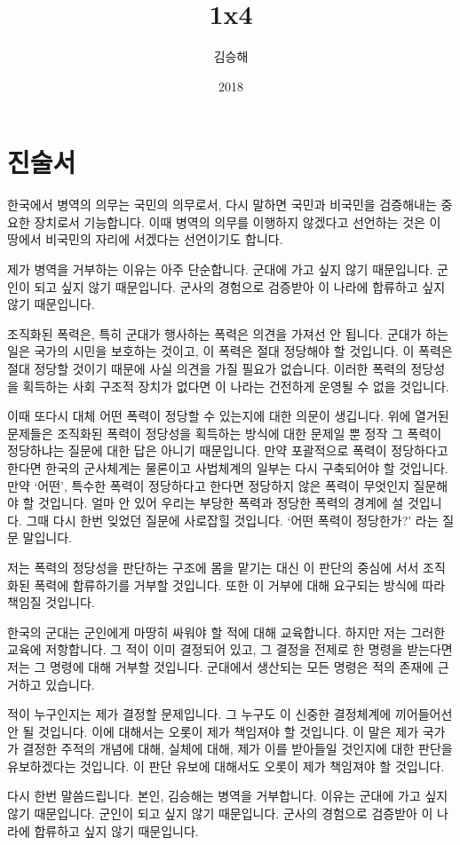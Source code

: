 \documentclass[12pt, b6paper, openany]{memoir}
\title{1x4}
\author{김승해}
\date{2018}
\newenvironment{article}{}{}
\begin{document}
\frontmatter
\begin{titlingpage}
\maketitle
\end{titlingpage}
  \tableofcontents
  
\mainmatter
\begin{article}
\hypertarget{uxc9c4uxc220uxc11c}{%
\chapter{진술서}\label{uxc9c4uxc220uxc11c}}

한국에서 병역의 의무는 국민의 의무로서, 다시 말하면 국민과 비국민을 검증해내는 중요한 장치로서 기능합니다. 이때 병역의 의무를 이행하지 않겠다고 선언하는 것은 이 땅에서 비국민의 자리에 서겠다는 선언이기도 합니다.

제가 병역을 거부하는 이유는 아주 단순합니다. 군대에 가고 싶지 않기 때문입니다. 군인이 되고 싶지 않기 때문입니다. 군사의 경험으로 검증받아 이 나라에 합류하고 싶지 않기 때문입니다.

조직화된 폭력은, 특히 군대가 행사하는 폭력은 의견을 가져선 안 됩니다. 군대가 하는 일은 국가의 시민을 보호하는 것이고, 이 폭력은 절대 정당해야 할 것입니다. 이 폭력은 절대 정당할 것이기 때문에 사실 의견을 가질 필요가 없습니다. 이러한 폭력의 정당성을 획득하는 사회 구조적 장치가 없다면 이 나라는 건전하게 운영될 수 없을 것입니다.

이때 또다시 대체 어떤 폭력이 정당할 수 있는지에 대한 의문이 생깁니다. 위에 열거된 문제들은 조직화된 폭력이 정당성을 획득하는 방식에 대한 문제일 뿐 정작 그 폭력이 정당하냐는 질문에 대한 답은 아니기 때문입니다. 만약 포괄적으로 폭력이 정당하다고 한다면 한국의 군사체계는 물론이고 사법체계의 일부는 다시 구축되어야 할 것입니다. 만약 `어떤', 특수한 폭력이 정당하다고 한다면 정당하지 않은 폭력이 무엇인지 질문해야 할 것입니다. 얼마 안 있어 우리는 부당한 폭력과 정당한 폭력의 경계에 설 것입니다. 그때 다시 한번 잊었던 질문에 사로잡힐 것입니다. `어떤 폭력이 정당한가?' 라는 질문 말입니다.

저는 폭력의 정당성을 판단하는 구조에 몸을 맡기는 대신 이 판단의 중심에 서서 조직화된 폭력에 합류하기를 거부할 것입니다. 또한 이 거부에 대해 요구되는 방식에 따라 책임질 것입니다.

한국의 군대는 군인에게 마땅히 싸워야 할 적에 대해 교육합니다. 하지만 저는 그러한 교육에 저항합니다. 그 적이 이미 결정되어 있고, 그 결정을 전제로 한 명령을 받는다면 저는 그 명령에 대해 거부할 것입니다. 군대에서 생산되는 모든 명령은 적의 존재에 근거하고 있습니다.

적이 누구인지는 제가 결정할 문제입니다. 그 누구도 이 신중한 결정체계에 끼어들어선 안 될 것입니다. 이에 대해서는 오롯이 제가 책임져야 할 것입니다. 이 말은 제가 국가가 결정한 주적의 개념에 대해, 실체에 대해, 제가 이를 받아들일 것인지에 대한 판단을 유보하겠다는 것입니다. 이 판단 유보에 대해서도 오롯이 제가 책임져야 할 것입니다.

다시 한번 말씀드립니다. 본인, 김승해는 병역을 거부합니다. 이유는 군대에 가고 싶지 않기 때문입니다. 군인이 되고 싶지 않기 때문입니다. 군사의 경험으로 검증받아 이 나라에 합류하고 싶지 않기 때문입니다.
\end{article}
\end{document}

